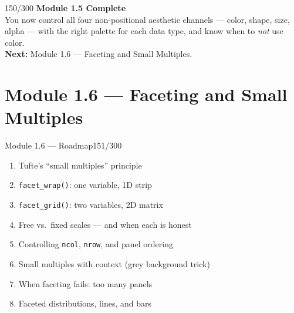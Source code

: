 \documentclass[10pt]{beamer}
\newcommand{\smark}[1]{\hfill{\scriptsize\color{codegray}#1}}
\begin{document}
\begin{frame}{}\smark{150/300}
\centering\vspace{1.5cm}
{\Large\textbf{Module 1.5 Complete}}\\[0.5cm]
You now control all four non-positional aesthetic channels --- color, shape, size, alpha --- with the right palette for each data type, and know when to \emph{not} use color.\\[0.5cm]
\textbf{Next:} Module 1.6 --- Faceting and Small Multiples.
\end{frame}

\section{Module 1.6 --- Faceting and Small Multiples}

\begin{frame}{Module 1.6 --- Roadmap}\smark{151/300}
\begin{enumerate}
    \item Tufte's ``small multiples'' principle
    \item \texttt{facet\_wrap()}: one variable, 1D strip
    \item \texttt{facet\_grid()}: two variables, 2D matrix
    \item Free vs.\ fixed scales --- and when each is honest
    \item Controlling \texttt{ncol}, \texttt{nrow}, and panel ordering
    \item Small multiples with context (grey background trick)
    \item When faceting fails: too many panels
    \item Faceted distributions, lines, and bars
\end{enumerate}
\end{frame}
\end{document}
